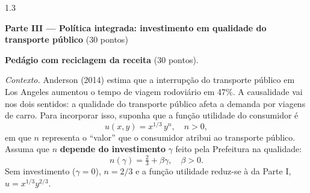\documentclass[11pt,addpoints]{exam}
\begin{document}
\begin{spacing}{1.3}
\begin{questions}
\end{questions}

\newpage

\begin{center}\large\textbf{Parte III --- Política integrada: investimento em qualidade do transporte público} \quad (30 pontos)\end{center}

\begin{questions}
\setcounter{question}{2}
\question \textbf{Pedágio com reciclagem da receita} (30 pontos).

\textit{Contexto.} Anderson (2014) estima que a interrupção do transporte público em Los Angeles aumentou o tempo de viagem rodoviário em 47\%. A causalidade vai nos dois sentidos: a qualidade do transporte público afeta a demanda por viagens de carro. Para incorporar isso, suponha que a função utilidade do consumidor é
\[
   u(x,y) = x^{1/3}\, y^{n}, \quad n > 0,
\]
em que $n$ representa o ``valor'' que o consumidor atribui ao transporte público. Assuma que $n$ \textbf{depende do investimento} $\gamma$ feito pela Prefeitura na qualidade:
\[
   n(\gamma) = \tfrac{2}{3} + \beta \gamma, \quad \beta > 0.
\]
Sem investimento ($\gamma = 0$), $n = 2/3$ e a função utilidade reduz-se à da Parte I, $u = x^{1/3} y^{2/3}$.

\end{questions}
\end{spacing}
\end{document}
